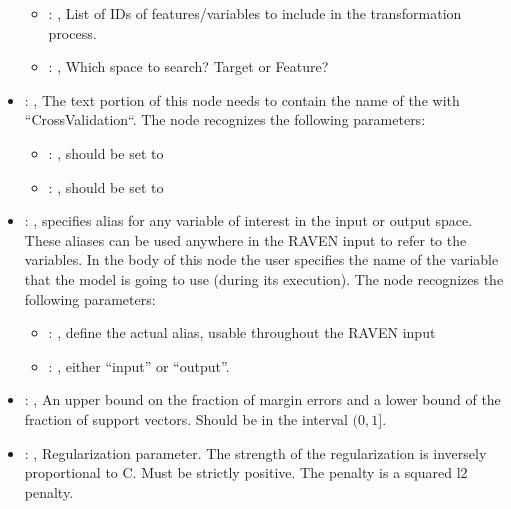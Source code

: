 \begin{itemize}
\begin{itemize}
        \item {}: , 
          List of IDs of features/variables to include in the transformation process.

        \item {}: , 
          Which space to search? Target or Feature?
      \end{itemize}

    \item {}: , 
      The text portion of this node needs to contain the name of the  with
               ``CrossValidation``.
      The  node recognizes the following parameters:
        \begin{itemize}
          \item {}: , 
            should be set to 
          \item {}: , 
            should be set to 
      \end{itemize}

    \item {}: , 
      specifies alias for         any variable of interest in the input or output space. These
      aliases can be used anywhere in the RAVEN input to         refer to the variables. In the body
      of this node the user specifies the name of the variable that the model is going to use
      (during its execution).
      The  node recognizes the following parameters:
        \begin{itemize}
          \item {}: , 
            define the actual alias, usable throughout the RAVEN input
          \item {}: , 
            either ``input'' or ``output''.
      \end{itemize}

    \item {}: , 
      An upper bound on the fraction of margin errors and
      a lower bound of the fraction of support vectors. Should be in the interval $(0, 1]$.

    \item {}: , 
      Regularization parameter. The strength of the regularization is inversely
      proportional to C.                                                           Must be strictly
      positive. The penalty is a squared l2 penalty.


\end{itemize}
